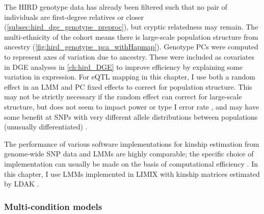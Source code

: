 The \gls{HIRD} genotype data has already been filtered such that no pair of individuals are first-degree relatives or closer (\cref{subsec:hird_dge_genotype_preproc}),
but cryptic relatedness may remain.
The multi-ethnicity of the cohort means there is large-scale population structure from ancestry (\cref{fig:hird_genotype_pca_withHapmap}).
Genotype \glspl{PC} were computed to represent axes of variation due to ancestry.
These were included as covariates in \gls{DGE} analyses in \cref{ch:hird_DGE} to improve efficiency by explaining some variation in expression.
For \gls{eQTL} mapping in this chapter, I use both a random effect in an \gls{LMM} and \gls{PC} fixed effects to correct for population structure.
This may not be strictly necessary if the random effect can correct for large-scale structure, 
but does not seem to impact power or type I error rate \autocite{widmer2015FurtherImprovementsLinear},
and may have some benefit at \glspl{SNP} with very different allele distributions between populations (unusually differentiated) \autocite{price2010NewApproachesPopulation}.

The performance of various software implementations 
for kinship estimation from genome-wide \gls{SNP} data and \glspl{LMM} are highly comparable; 
the specific choice of implementation can usually be made on the basis of computational efficiency \autocite{eu-ahsunthornwattana2014ComparisonMethodsAccount}.
In this chapter, I use
\glspl{LMM} implemented in {LIMIX} \autocite{lippert2014LIMIXGeneticAnalysis}
with kinship matrices estimated by {LDAK} \autocite{speed2012ImprovedHeritabilityEstimation}.

\subsubsection{Multi-condition models}

